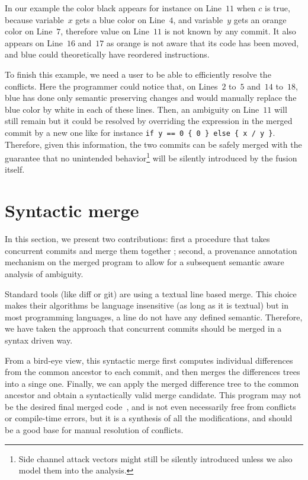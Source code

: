 \documentclass[a4paper,11pt]{article}
\newcommand\yrg[1]{{\color{red}{(\textbf{YRG:} #1)}}}
\begin{document}
In our example the color black appears for instance on Line~$11$ when
$c$ is true, because variable~$x$ gets a blue color on Line~$4$, and
variable~$y$ gets an orange color on Line~$7$, therefore value on
Line~$11$ is not known by any commit. It also appears on Line~$16$
and~$17$ as orange is not aware that its code has been moved, and blue
could theoretically have reordered instructions.

To finish this example, we need a user to be able to efficiently
resolve the conflicts. Here the programmer could notice that, on
Lines~$2$ to~$5$ and~$14$ to~$18$, blue has done only semantic
preserving changes and would manually replace the blue color by white
in each of these lines. Then, an ambiguity on Line~$11$ will still
remain but it could be resolved by overriding the expression in the
merged commit by a new one like for instance%
\lstinline$if y == 0 { 0 } else { x / y }$.
Therefore, given this information, the two commits
can be safely merged with the guarantee that no unintended
behavior\footnote{Side channel attack vectors might still be silently
  introduced unless we also model them into the analysis.} will be
silently introduced by the fusion itself.

\section{Syntactic merge}
\label{sec:syntactic-merge}

In this section, we present two contributions: first a procedure that
takes concurrent commits and merge them together ; second, a
provenance annotation mechanism on the merged program to allow for a
subsequent semantic aware analysis of ambiguity.

Standard tools (like diff or git) are using a textual line based
merge. This choice makes their algorithms be language insensitive (as
long as it is textual) but in most programming languages, a line do
not have any defined semantic. Therefore, we have taken the approach
that concurrent commits should be merged in a syntax driven way.

From a bird-eye view, this syntactic merge first computes individual
differences from the common ancestor to each commit, and then merges
the differences trees into a singe one. Finally, we can apply the
merged difference tree to the common ancestor and obtain a
syntactically valid merge candidate. This program may not be the
desired final merged code~\yrg{Why?}, and is not even necessarily free
from conflicts or compile-time errors, but it is a synthesis of all
the modifications, and should be a good base for manual resolution of
conflicts.
\end{document}
